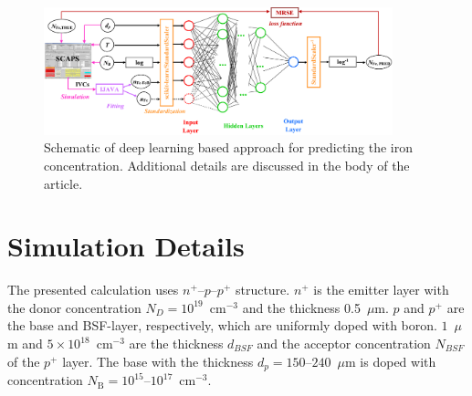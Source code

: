 \documentclass[a4paper,fleqn]{cas-sc}
\begin{document}
\begin{figure}
\centering
\includegraphics[width=0.9\textwidth]{Chem}
\caption{Schematic of deep learning based approach  for predicting the iron concentration.
Additional details are discussed in the body of the article.}
\label{fig_chem}
\end{figure}


\section{Simulation Details}

The presented calculation uses $n^+$--$p$--$p^+$ structure.
$n^+$ is the emitter layer with the donor concentration $N_D=10^{19}$~cm$^{-3}$ and
the thickness 0.5~$\mu$m.
$p$ and $p^+$ are the base and BSF-layer, respectively, which are uniformly doped with boron.
$1$~$\mu$m and $5\times10^{18}$~cm$^{-3}$ are the thickness $d_{BSF}$ and the acceptor concentration $N_{BSF}$
of the $p^+$ layer.
The base with the thickness $d_p=150$--$240$~$\mu$m is doped with concentration
$N_\mathrm{B}=10^{15}$--$10^{17}$~cm$^{-3}$.
\end{document}
